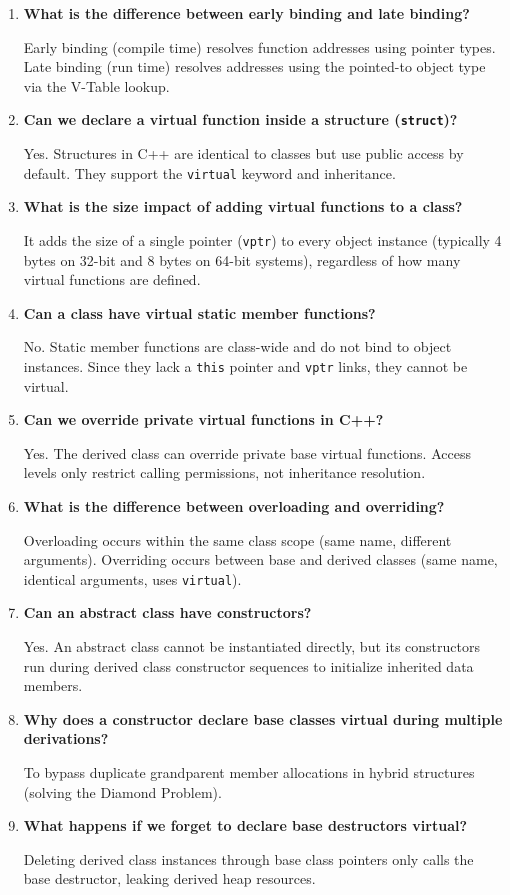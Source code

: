 \documentclass[12pt,a4paper]{article}
\newcommand{\Q}[1]{\textbf{#1}\par\noindent\ignorespaces}
\begin{document}
\begin{tcolorbox}[exambox, title={\textbf{Frequently Asked / Viva Questions}}]
\begin{enumerate}[topsep=0pt, label=\textbf{Q\arabic*.}, itemsep=5pt]
  \item \Q{What is the difference between early binding and late binding?}
    Early binding (compile time) resolves function addresses using pointer types. Late binding (run time) resolves addresses using the pointed-to object type via the V-Table lookup.
  \item \Q{Can we declare a virtual function inside a structure (\texttt{struct})?}
    Yes. Structures in C++ are identical to classes but use public access by default. They support the \texttt{virtual} keyword and inheritance.
  \item \Q{What is the size impact of adding virtual functions to a class?}
    It adds the size of a single pointer (\texttt{vptr}) to every object instance (typically 4 bytes on 32-bit and 8 bytes on 64-bit systems), regardless of how many virtual functions are defined.
  \item \Q{Can a class have virtual static member functions?}
    No. Static member functions are class-wide and do not bind to object instances. Since they lack a \texttt{this} pointer and \texttt{vptr} links, they cannot be virtual.
  \item \Q{Can we override private virtual functions in C++?}
    Yes. The derived class can override private base virtual functions. Access levels only restrict calling permissions, not inheritance resolution.
  \item \Q{What is the difference between overloading and overriding?}
    Overloading occurs within the same class scope (same name, different arguments). Overriding occurs between base and derived classes (same name, identical arguments, uses \texttt{virtual}).
  \item \Q{Can an abstract class have constructors?}
    Yes. An abstract class cannot be instantiated directly, but its constructors run during derived class constructor sequences to initialize inherited data members.
  \item \Q{Why does a constructor declare base classes virtual during multiple derivations?}
    To bypass duplicate grandparent member allocations in hybrid structures (solving the Diamond Problem).
  \item \Q{What happens if we forget to declare base destructors virtual?}
    Deleting derived class instances through base class pointers only calls the base destructor, leaking derived heap resources.

\end{enumerate}
\end{tcolorbox}
\end{document}
